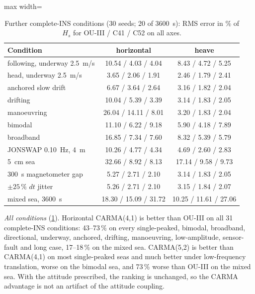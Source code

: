 \documentclass[conference]{IEEEtran}
\theoremstyle{bodysmall}
\begin{document}
\begin{table}[t]
\centering
\caption{Further complete-INS conditions (30 seeds; 20 of \SI{3600}{s}):
RMS error in \% of $H_s$ for OU-III / C41 / C52 on all axes.}
\label{tab:conditions}
\footnotesize
\setlength{\tabcolsep}{2.5pt}
\begin{adjustbox}{max width=\columnwidth}
\begin{tabular}{@{}lcc@{}}
\toprule
Condition & horizontal & heave\\
\midrule
following, underway \SI{2.5}{m/s} & 10.54 / 4.03 / 4.04 & 8.43 / 4.72 / 5.25\\
head, underway \SI{2.5}{m/s} & 3.65 / 2.06 / 1.91 & 2.46 / 1.79 / 2.41\\
anchored slow drift & 6.67 / 3.64 / 2.64 & 3.16 / 1.82 / 2.04\\
drifting & 10.04 / 5.39 / 3.39 & 3.14 / 1.83 / 2.05\\
manoeuvring & 26.04 / 14.11 / 8.01 & 3.20 / 1.83 / 2.04\\
bimodal & 11.10 / 6.22 / 9.18 & 5.90 / 4.18 / 7.89\\
broadband & 16.85 / 7.34 / 7.60 & 8.32 / 5.39 / 5.79\\
JONSWAP \SI{0.10}{Hz}, \SI{4}{m} & 10.26 / 4.77 / 4.34 & 4.69 / 2.60 / 2.83\\
\SI{5}{cm} sea & 32.66 / 8.92 / 8.13 & 17.14 / 9.58 / 9.73\\
\SI{300}{s} magnetometer gap & 5.27 / 2.71 / 2.10 & 3.14 / 1.83 / 2.05\\
$\pm25\,\%$ $dt$ jitter & 5.26 / 2.71 / 2.10 & 3.15 / 1.84 / 2.07\\
mixed sea, \SI{3600}{s} & 18.30 / 15.09 / 31.72 & 10.25 / 11.61 / 27.06\\
\bottomrule
\end{tabular}
\end{adjustbox}
\end{table}

\emph{All conditions} (\cref{tab:conditions}). Horizontal CARMA(4,1) is
better than OU-III on all 31 complete-INS conditions: 43--73\,\% on every
single-peaked, bimodal, broadband, directional, underway, anchored, drifting,
manoeuvring, low-amplitude, sensor-fault and long case, 17--18\,\% on the
mixed sea. CARMA(5,2) is better than CARMA(4,1) on most single-peaked seas
and much better under low-frequency translation, worse on the bimodal sea,
and 73\,\% worse than OU-III on the mixed sea. With the attitude prescribed,
the ranking is unchanged, so the CARMA advantage is not an artifact of the
attitude coupling.
\end{document}
